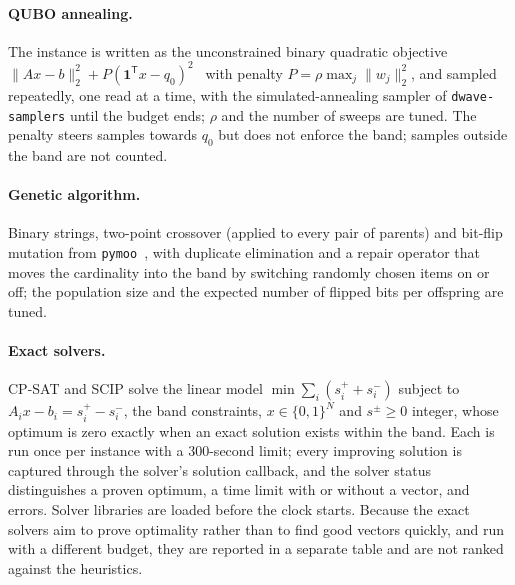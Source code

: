 \documentclass[pdflatex,sn-mathphys-num]{sn-jnl}
\theoremstyle{thmstyleone}
\theoremstyle{thmstylethree}
\newcommand{\B}{\{0,1\}}
\begin{document}
\paragraph{QUBO annealing.} The instance is written as the unconstrained binary quadratic objective $\|Ax-b\|_2^2+P(\mathbf 1^{\mathsf T}x-q_0)^2$~\cite{lucas2014} with penalty $P=\rho\max_j\|w_j\|_2^2$, and sampled repeatedly, one read at a time, with the simulated-annealing sampler of \texttt{dwave-samplers} until the budget ends; $\rho$ and the number of sweeps are tuned. The penalty steers samples towards $q_0$ but does not enforce the band; samples outside the band are not counted.

\paragraph{Genetic algorithm.} Binary strings, two-point crossover (applied to every pair of parents) and bit-flip mutation from \texttt{pymoo}~\cite{blank2020}, with duplicate elimination and a repair operator that moves the cardinality into the band by switching randomly chosen items on or off; the population size and the expected number of flipped bits per offspring are tuned.

\paragraph{Exact solvers.} CP-SAT and SCIP solve the linear model $\min\sum_i(s_i^++s_i^-)$ subject to $A_ix-b_i=s_i^+-s_i^-$, the band constraints, $x\in\B^N$ and $s^\pm\ge0$ integer, whose optimum is zero exactly when an exact solution exists within the band. Each is run once per instance with a 300-second limit; every improving solution is captured through the solver's solution callback, and the solver status distinguishes a proven optimum, a time limit with or without a vector, and errors. Solver libraries are loaded before the clock starts. Because the exact solvers aim to prove optimality rather than to find good vectors quickly, and run with a different budget, they are reported in a separate table and are not ranked against the heuristics.
\end{document}
